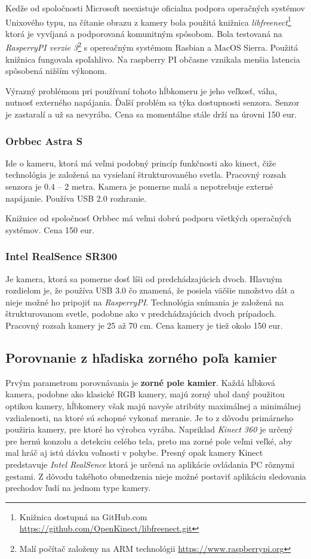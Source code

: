 Kedže od spoločnosti Microsoft neexistuje oficialna podpora operačných systémov Unixového typu, na čítanie obrazu z kamery bola použitá knižnica \textit{libfreenect}\footnote{Knižnica dostupná na GitHub.com \url{https://github.com/OpenKinect/libfreenect.git}} ktorá je vyvíjaná a podporovaná komunitným spôsobom. Bola testovaná na \textit{RasperryPI verzie 3}\footnote{Malí počítač založeny na ARM technológii \url{https://www.raspberrypi.org}} s opereačným systémom Rasbian a MacOS Sierra. Použitá knižnica fungovala spoľahlivo. Na raspberry PI občasne vznikala menšia latencia spôsobená nižším výkonom.  

Výrazný problémom pri používaní tohoto hĺbkomeru je jeho veľkosť, váha, nutnosť externého napájania. Ďalší problém sa týka dostupnosti senzora. Senzor je zastaralí a už sa nevyrába. Cena sa momentálne stále drží na úrovni 150 eur. 

\subsubsection{Orbbec Astra S}
Ide o kameru, ktorá má veľmi podobný princíp funkčnosti ako kinect, čiže technológia je založená na vysielaní štrukturovaného svetla. Pracovný rozsah senzora je 0.4 – 2 metra. Kamera je pomerne malá a nepotrebuje externé napájanie. Používa USB 2.0 rozhranie. 

Knižnice od spoločnosť Orbbec má veľmi dobrú podporu všetkých operačných systémov. Cena 150 eur. 


\subsubsection{Intel RealSence SR300}
Je kamera, ktorá sa pomerne dosť líši od predchádzajúcich dvoch. Hlavným rozdielom je, že používa USB 3.0 čo znamená, že posiela väčšie množstvo dát a nieje možné ho pripojiť na \textit{RasperryPI}. Technológia snímania je založená na štrukturovanom svetle, podobne ako v predchádzajúcich dvoch prípadoch. Pracovný rozsah kamery je 25 až 70 cm. Cena kamery je tiež okolo 150 eur. 

\subsection{Porovnanie z hľadiska zorného poľa kamier}
Prvým parametrom porovnávania je \textbf{zorné pole kamier}. Každá hĺbková kamera, podobne ako klasické RGB kamery, majú zorný uhol daný použitou optikou kamery, hĺbkomery však majú navyše atribúty maximálnej a minimálnej vzdialenosti, na ktoré sú schopné vykonať meranie. Je to z dôvodu primárneho použiria kamery, pre ktoré ho výrobca vyrába. Napriklad \textit{Kinect 360} je určený pre hernú konzolu a detekciu celého tela, preto ma zorné pole veľmi veľké, aby mal hráč aj istú dávku voľnosti v pohybe. Presný opak kamery Kinect predstavuje \textit{Intel RealSence} ktorá je určená na aplikácie ovládania PC rôznymi gestami. Z dôvodu takéhoto obmedzenia nieje možné postaviť aplikáciu sledovania prechodov ľudí na jednom type kamery.



